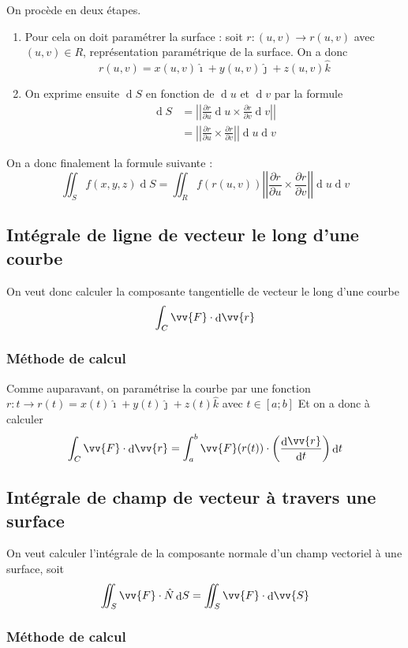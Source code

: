 \documentclass[11pt,a4paper]{article}
\theoremstyle{definition}
\newcommand{\kmath}{k}
\DeclareMathOperator{\diff}{d}
\newcommand{\dif}{\diff\!}
\newcommand{\pa}{\partial}
\begin{document}
On procède en deux étapes.
\begin{enumerate}
	\item Pour cela on doit paramétrer la surface : soit $r : (u,v) \to r(u,v)$ avec $(u,v) \in R$, représentation paramétrique de la surface. On a donc
		\[ r(u,v) = x(u,v) \hat{\imath} + y(u,v) \hat{\jmath} + z(u,v) \hat{\kmath} \]
	\item On exprime ensuite $\dif S$ en fonction de $\dif u$ et $\dif v$ par la formule
		\begin{align*} \dif S & = \left| \left| \frac{\pa r}{\pa u} \dif u \times \frac{\pa r}{\pa v} \dif v \right| \right| \\
			& = \left| \left| \frac{\pa r}{\pa u} \times \frac{\pa r}{\pa v} \right| \right|  \dif u \dif v
		\end{align*}
\end{enumerate}
On a donc finalement la formule suivante :
\[ \iint_S f(x,y,z) \dif S = \iint_R f(r(u,v)) \left| \left| \frac{\pa r}{\pa u} \times \frac{\pa r}{\pa v} \right| \right|  \dif u \dif v \]

\subsection{Intégrale de ligne de vecteur le long d'une courbe}

On veut donc calculer la composante tangentielle de vecteur le long d'une courbe
\[ \int_C \vv{F} \cdot \dif \vv{r} \]

\subsubsection{Méthode de calcul}

Comme auparavant, on paramétrise la courbe par une fonction $r : t \to r(t) = x(t) \hat{\imath} + y(t) \hat{\jmath} + z(t) \hat{\kmath}$ avec $t \in [a;b]$
Et on a donc à calculer
\[ \int_C \vv{F} \cdot \dif \vv{r} = \int_a^b \vv{F}(r(t)) \cdot \left(  \frac{\dif \vv{r}}{\dif t} \right) \dif t \]

\subsection{Intégrale de champ de vecteur à travers une surface}

On veut calculer l'intégrale de la composante normale d'un champ vectoriel à une surface, soit
\[ \iint_S \vv{F} \cdot \hat{N} \dif S = \iint_S \vv{F} \cdot \dif \vv{S} \]

\subsubsection{Méthode de calcul}
\end{document}
